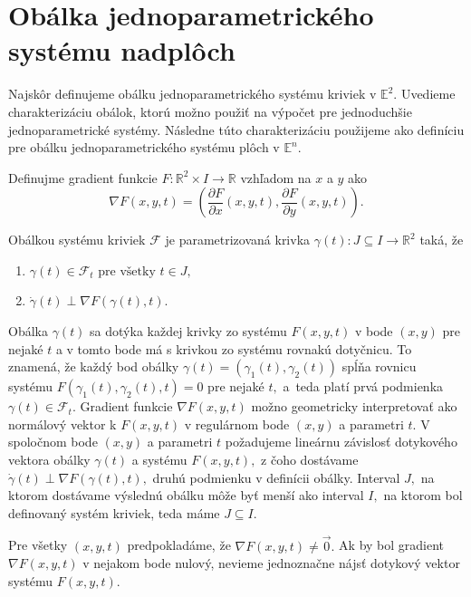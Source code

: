 \section{Obálka jednoparametrického systému nadplôch}
Najskôr definujeme obálku jednoparametrického systému kriviek v $\mathbb{E}^2$. Uvedieme charakterizáciu obálok, ktorú možno použiť na výpočet pre jednoduchšie jednoparametrické systémy. Následne túto charakterizáciu použijeme ako definíciu pre obálku jednoparametrického systému plôch v $\mathbb{E}^n$.

\begin{definition}
Definujme gradient funkcie $F \colon \mathbb{R}^2 \times I \rightarrow \mathbb{R}$ vzhľadom na $x$ a $y$ ako
$$\nabla F(x, y, t) = \left(\frac{\partial F}{\partial x}(x, y, t), \frac{\partial F}{\partial y}(x, y, t) \right).$$ 
\end{definition}

\begin{definition}
Obálkou systému kriviek $ \mathcal{F} $ je parametrizovaná krivka $\gamma(t) \colon J \subseteq I \rightarrow \mathbb{R}^{2}$ taká, že 
\begin{enumerate}
\item $\gamma(t) \in \mathcal{F}_{t} \text{ pre všetky } t \in J,$
\item $\dot{\gamma}(t) \perp \nabla F \left( \gamma(t), t \right).$
\end{enumerate}
\end{definition}

Obálka $\gamma(t)$ sa dotýka každej krivky zo systému $F(x,y,t)$ v bode $(x, y)$  pre nejaké $t$ a v tomto bode má s krivkou zo systému rovnakú dotyčnicu. To znamená, že každý bod obálky ${\gamma}(t) = (\gamma_{1}(t),\gamma_{2}(t))$ spĺňa rovnicu systému $F(\gamma_{1}(t),\gamma_{2}(t),t)=0$ pre nejaké $t,$ a~teda platí prvá podmienka $\gamma(t) \in \mathcal{F}_{t}$. Gradient funkcie $ \nabla F(x,y,t)$ možno geometricky interpretovať ako normálový vektor k $F(x,y,t)$ v regulárnom bode $(x,y)$ a parametri $t$. V spoločnom bode $(x,y)$ a parametri $t$ požadujeme lineárnu závislosť dotykového vektora obálky $\gamma(t)$ a systému $F(x,y,t), $ z čoho dostávame $\dot{\gamma}(t) \perp \nabla F \left( \gamma(t), t \right), $ druhú podmienku v definícii obálky. Interval $J,$ na ktorom dostávame výslednú obálku môže byť menší ako interval $I,$ na ktorom bol definovaný systém kriviek, teda máme $J \subseteq I.$

Pre všetky $(x, y, t)$ predpokladáme, že  $\nabla F(x,y,t) \neq \vec{0}. $  Ak by bol gradient $\nabla F(x,y,t) $ v nejakom bode nulový, nevieme jednoznačne nájsť dotykový vektor systému $F(x, y, t).$ 

